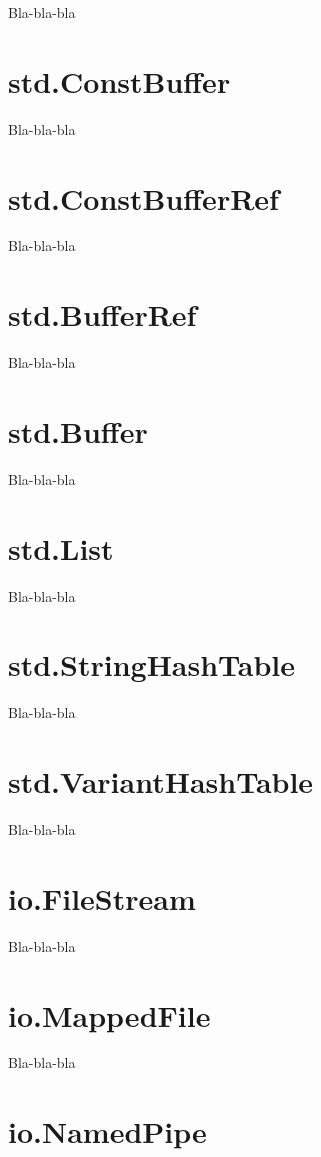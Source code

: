 \documentclass[oneside]{book}
\begin{document}
Bla-bla-bla

\section{std.ConstBuffer}

Bla-bla-bla

\section{std.ConstBufferRef}

Bla-bla-bla

\section{std.BufferRef}

Bla-bla-bla

\section{std.Buffer}

Bla-bla-bla

\section{std.List}

Bla-bla-bla

\section{std.StringHashTable}

Bla-bla-bla

\section{std.VariantHashTable}

Bla-bla-bla

\section{io.FileStream}

Bla-bla-bla

\section{io.MappedFile}

Bla-bla-bla

\section{io.NamedPipe}
\end{document}
